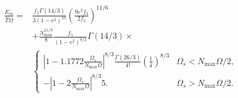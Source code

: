 \documentclass[
        fleqn,
        usenatbib,
        referee,
    ]{mnras}
\newcommand*{\abs}[1]{\left|#1\right|}
\newcommand*{\p}[1]{\left(#1\right)}
\begin{document}
\begin{align}
    \frac{\dot{E}_{in}}{\hat{T}\Omega} ={}&
            \frac{f_5 \Gamma(14/3)}{3\p{1 - e^2}^{10}}
                \p{\frac{9e^2f_3}{2f_5}}^{11/6}\nonumber\\
        &+
            \frac{N_{\max}^{11/3}}{8}
            \frac{f_5}{\p{1 - e^2}^{9/2}}
            \Gamma\p{14/3} \times\nonumber\\
        &\begin{cases}
            \abs{1 - 1.1772\frac{\Omega_s}{N_{\max}\Omega}}^{8/3}
                \frac{\Gamma\p{26/3}}{4!}\p{\frac{1}{4}}^{8/3}
                & \Omega_s < N_{\max}\Omega/2,\\[5pt]
            -\abs{1 - 2\frac{\Omega_s}{N_{\max}\Omega}}^{8/3}5.
                & \Omega_s > N_{\max}\Omega/2.
        \end{cases}
\end{align}






\bsp
\label{lastpage} %
\end{document}
